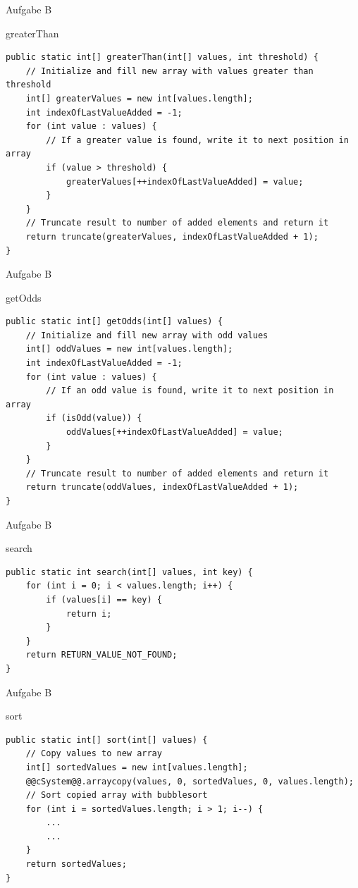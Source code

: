 \documentclass[aspectratio=169]{beamer}
\begin{document}
\begin{frame}[fragile]{Aufgabe B}
  \begin{block}{greaterThan}
    \begin{lstlisting}
public static int[] greaterThan(int[] values, int threshold) {
    // Initialize and fill new array with values greater than threshold
    int[] greaterValues = new int[values.length];
    int indexOfLastValueAdded = -1;
    for (int value : values) {
        // If a greater value is found, write it to next position in array
        if (value > threshold) {
            greaterValues[++indexOfLastValueAdded] = value;
        }
    }
    // Truncate result to number of added elements and return it
    return truncate(greaterValues, indexOfLastValueAdded + 1);
}
    \end{lstlisting}
  \end{block}
\end{frame}


\begin{frame}[fragile]{Aufgabe B}
  \begin{block}{getOdds}
    \begin{lstlisting}
public static int[] getOdds(int[] values) {
    // Initialize and fill new array with odd values
    int[] oddValues = new int[values.length];
    int indexOfLastValueAdded = -1;
    for (int value : values) {
        // If an odd value is found, write it to next position in array
        if (isOdd(value)) {
            oddValues[++indexOfLastValueAdded] = value;
        }
    }
    // Truncate result to number of added elements and return it
    return truncate(oddValues, indexOfLastValueAdded + 1);
}
    \end{lstlisting}
  \end{block}
\end{frame}



\begin{frame}[fragile]{Aufgabe B}
  \begin{block}{search}
    \begin{lstlisting}
public static int search(int[] values, int key) {
    for (int i = 0; i < values.length; i++) {
        if (values[i] == key) {
            return i;
        }
    }
    return RETURN_VALUE_NOT_FOUND;
}
    \end{lstlisting}
  \end{block}
\end{frame}

\begin{frame}[fragile]{Aufgabe B}
  \begin{block}{sort}
    \begin{lstlisting}
public static int[] sort(int[] values) {
    // Copy values to new array
    int[] sortedValues = new int[values.length];
    @@cSystem@@.arraycopy(values, 0, sortedValues, 0, values.length);
    // Sort copied array with bubblesort
    for (int i = sortedValues.length; i > 1; i--) {
        ...
        ...
    }
    return sortedValues;
}
    \end{lstlisting}
  \end{block}
\end{frame}
\end{document}
